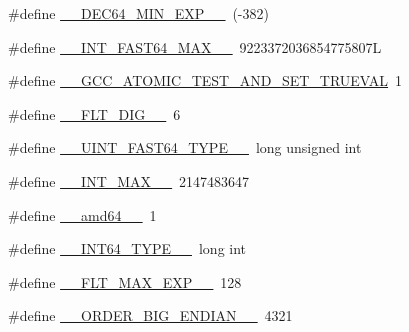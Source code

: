 \begin{DoxyCompactItemize}
\item 
\#define \hyperlink{build-analizer__host-_desktop___qt__5__9__0___g_c_c__64bit-debug_2moc__predefs_8h_ade7aebdae6e8389a450aac653544c33f}{\+\_\+\+\_\+\+D\+E\+C64\+\_\+\+M\+I\+N\+\_\+\+E\+X\+P\+\_\+\+\_\+}~(-\/382)
\item 
\#define \hyperlink{build-analizer__host-_desktop___qt__5__9__0___g_c_c__64bit-debug_2moc__predefs_8h_af456a5199e68c3ff20996a5bdf9b4691}{\+\_\+\+\_\+\+I\+N\+T\+\_\+\+F\+A\+S\+T64\+\_\+\+M\+A\+X\+\_\+\+\_\+}~9223372036854775807\+L
\item 
\#define \hyperlink{build-analizer__host-_desktop___qt__5__9__0___g_c_c__64bit-debug_2moc__predefs_8h_a035c056d72e677daa49cc2c7dbeed083}{\+\_\+\+\_\+\+G\+C\+C\+\_\+\+A\+T\+O\+M\+I\+C\+\_\+\+T\+E\+S\+T\+\_\+\+A\+N\+D\+\_\+\+S\+E\+T\+\_\+\+T\+R\+U\+E\+V\+A\+L}~1
\item 
\#define \hyperlink{build-analizer__host-_desktop___qt__5__9__0___g_c_c__64bit-debug_2moc__predefs_8h_a03e66bc6e427f0c968a7a0daec280729}{\+\_\+\+\_\+\+F\+L\+T\+\_\+\+D\+I\+G\+\_\+\+\_\+}~6
\item 
\#define \hyperlink{build-analizer__host-_desktop___qt__5__9__0___g_c_c__64bit-debug_2moc__predefs_8h_a3877156c4b30153ae764b0dad8d8130a}{\+\_\+\+\_\+\+U\+I\+N\+T\+\_\+\+F\+A\+S\+T64\+\_\+\+T\+Y\+P\+E\+\_\+\+\_\+}~long unsigned int
\item 
\#define \hyperlink{build-analizer__host-_desktop___qt__5__9__0___g_c_c__64bit-debug_2moc__predefs_8h_a20fcee7a683d69340d8c3d126e5a7f12}{\+\_\+\+\_\+\+I\+N\+T\+\_\+\+M\+A\+X\+\_\+\+\_\+}~2147483647
\item 
\#define \hyperlink{build-analizer__host-_desktop___qt__5__9__0___g_c_c__64bit-debug_2moc__predefs_8h_a8d57bedda11fe9ca16132e126d84669e}{\+\_\+\+\_\+amd64\+\_\+\+\_\+}~1
\item 
\#define \hyperlink{build-analizer__host-_desktop___qt__5__9__0___g_c_c__64bit-debug_2moc__predefs_8h_a690dd4c0c7711687e30418f5e988d842}{\+\_\+\+\_\+\+I\+N\+T64\+\_\+\+T\+Y\+P\+E\+\_\+\+\_\+}~long int
\item 
\#define \hyperlink{build-analizer__host-_desktop___qt__5__9__0___g_c_c__64bit-debug_2moc__predefs_8h_abd1effb8f681ce210223aceb08d8ed33}{\+\_\+\+\_\+\+F\+L\+T\+\_\+\+M\+A\+X\+\_\+\+E\+X\+P\+\_\+\+\_\+}~128
\item 
\#define \hyperlink{build-analizer__host-_desktop___qt__5__9__0___g_c_c__64bit-debug_2moc__predefs_8h_a190d0219caabccc0e05909f39bcb00d6}{\+\_\+\+\_\+\+O\+R\+D\+E\+R\+\_\+\+B\+I\+G\+\_\+\+E\+N\+D\+I\+A\+N\+\_\+\+\_\+}~4321
\item 

\end{DoxyCompactItemize}

